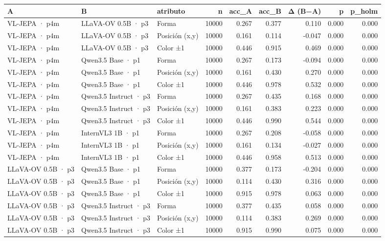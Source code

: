 \begin{tabular}{lllrrrrrr}
\toprule
A & B & atributo & n & acc\_A & acc\_B & Δ (B−A) & p & p\_holm \\
\midrule
VL-JEPA · p4m & LLaVA-OV 0.5B · p3 & Forma & 10000 & 0.267 & 0.377 & 0.110 & 0.000 & 0.000 \\
VL-JEPA · p4m & LLaVA-OV 0.5B · p3 & Posición (x,y) & 10000 & 0.161 & 0.114 & -0.047 & 0.000 & 0.000 \\
VL-JEPA · p4m & LLaVA-OV 0.5B · p3 & Color ±1 & 10000 & 0.446 & 0.915 & 0.469 & 0.000 & 0.000 \\
VL-JEPA · p4m & Qwen3.5 Base · p1 & Forma & 10000 & 0.267 & 0.173 & -0.094 & 0.000 & 0.000 \\
VL-JEPA · p4m & Qwen3.5 Base · p1 & Posición (x,y) & 10000 & 0.161 & 0.430 & 0.270 & 0.000 & 0.000 \\
VL-JEPA · p4m & Qwen3.5 Base · p1 & Color ±1 & 10000 & 0.446 & 0.978 & 0.532 & 0.000 & 0.000 \\
VL-JEPA · p4m & Qwen3.5 Instruct · p3 & Forma & 10000 & 0.267 & 0.435 & 0.168 & 0.000 & 0.000 \\
VL-JEPA · p4m & Qwen3.5 Instruct · p3 & Posición (x,y) & 10000 & 0.161 & 0.383 & 0.223 & 0.000 & 0.000 \\
VL-JEPA · p4m & Qwen3.5 Instruct · p3 & Color ±1 & 10000 & 0.446 & 0.990 & 0.544 & 0.000 & 0.000 \\
VL-JEPA · p4m & InternVL3 1B · p1 & Forma & 10000 & 0.267 & 0.208 & -0.058 & 0.000 & 0.000 \\
VL-JEPA · p4m & InternVL3 1B · p1 & Posición (x,y) & 10000 & 0.161 & 0.134 & -0.027 & 0.000 & 0.000 \\
VL-JEPA · p4m & InternVL3 1B · p1 & Color ±1 & 10000 & 0.446 & 0.958 & 0.513 & 0.000 & 0.000 \\
LLaVA-OV 0.5B · p3 & Qwen3.5 Base · p1 & Forma & 10000 & 0.377 & 0.173 & -0.204 & 0.000 & 0.000 \\
LLaVA-OV 0.5B · p3 & Qwen3.5 Base · p1 & Posición (x,y) & 10000 & 0.114 & 0.430 & 0.316 & 0.000 & 0.000 \\
LLaVA-OV 0.5B · p3 & Qwen3.5 Base · p1 & Color ±1 & 10000 & 0.915 & 0.978 & 0.063 & 0.000 & 0.000 \\
LLaVA-OV 0.5B · p3 & Qwen3.5 Instruct · p3 & Forma & 10000 & 0.377 & 0.435 & 0.058 & 0.000 & 0.000 \\
LLaVA-OV 0.5B · p3 & Qwen3.5 Instruct · p3 & Posición (x,y) & 10000 & 0.114 & 0.383 & 0.269 & 0.000 & 0.000 \\
LLaVA-OV 0.5B · p3 & Qwen3.5 Instruct · p3 & Color ±1 & 10000 & 0.915 & 0.990 & 0.075 & 0.000 & 0.000 \\

\end{tabular}
